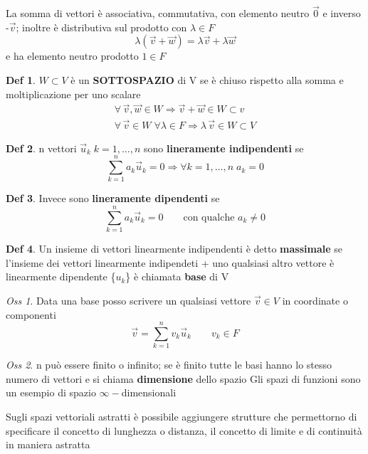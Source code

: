 \documentclass[a4paper,11pt]{report}
\theoremstyle{remark}
\newtheorem*{oss}{Oss}
\theoremstyle{definition}
\newtheorem*{Def}{Def}
\begin{document}
\noindent La somma di vettori è associativa, commutativa, con elemento neutro $\vec{0}$ e inverso -$\vec{v}$; inoltre è distributiva sul prodotto con $\lambda \in F$ 
\[\lambda (\vec{v}+\vec{w}) = \lambda\vec{v}+\lambda\vec{w}\]
e ha elemento neutro prodotto $1\in F$

\begin{Def}
	$W \subset V$ è un \textbf{SOTTOSPAZIO} di V se è chiuso rispetto alla somma e moltiplicazione per uno scalare
	\begin{gather*}
		\forall\, \vec{v}, \vec{w} \in W \Rightarrow \vec{v}+\vec{w}\in W \subset v \\
		\forall \, \vec{v} \in W \; \forall \lambda \in F \Rightarrow \lambda \, \vec{v} \in W \subset V 
	\end{gather*}
\end{Def}

\begin{Def}
	n vettori $\vec{u}_k \; k = 1, \dots , n$ sono \textbf{lineramente indipendenti} se 
	\[\sum_{k=1}^n a_k \vec{u}_k = 0 \Rightarrow \forall k = 1,\dots,n 	\; a_k=0\]
\end{Def}

\begin{Def}
	Invece sono \textbf{lineramente dipendenti} se 
	\[\sum_{k=1}^n a_k\vec{u}_k = 0 \qquad \text{con qualche } a_k \ne 0\]
\end{Def}

\begin{Def}
	Un insieme di vettori linearmente indipendenti è detto \textbf{massimale} se l'insieme dei vettori linearmente indipendeti + uno qualsiasi altro vettore è linearmente dipendente \newline
	\{$u_k$\} è chiamata \textbf{base} di V
\end{Def}

\begin{oss}
	Data una base posso scrivere un qualsiasi vettore $\vec{v}\in V$ in coordinate o componenti
	\[\vec{v} = \sum_{k=1}^n v_k\vec{u}_k \qquad v_k \in F\]
\end{oss}

\begin{oss}
	n può essere finito o infinito; se è finito tutte le basi hanno lo stesso numero di vettori e si chiama \textbf{dimensione} dello spazio \newline
	Gli spazi di funzioni sono un esempio di spazio $\infty-$dimensionali
\end{oss}

\noindent Sugli spazi vettoriali astratti è possibile aggiungere strutture che permettorno di specificare il concetto di lunghezza o distanza, il concetto di limite e di continuità in maniera astratta
\end{document}
